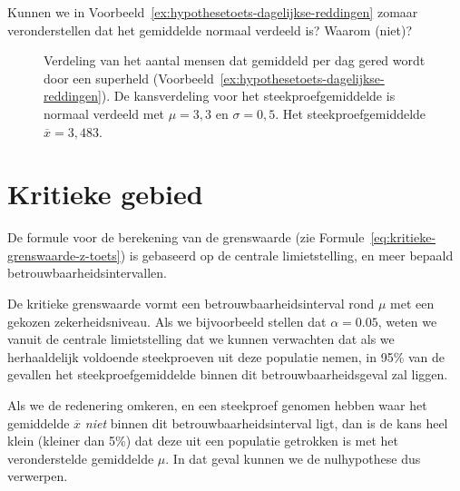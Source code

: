 \begin{exercise}
  Kunnen we in Voorbeeld~\ref{ex:hypothesetoets-dagelijkse-reddingen} zomaar veronderstellen dat het gemiddelde normaal verdeeld is? Waarom (niet)?
\end{exercise}

\begin{figure}
  \centering
  \caption{Verdeling van het aantal mensen dat gemiddeld per dag gered wordt door een superheld (Voorbeeld~\ref{ex:hypothesetoets-dagelijkse-reddingen}). De kansverdeling voor het steekproefgemiddelde is normaal verdeeld met $\mu = 3,3$ en $\sigma = 0,5$. Het steekproefgemiddelde $\overline{x} =3,483$.}
  \label{fig:hypothesetoets-reddingen-per-dag}
\end{figure}

\section{Kritieke gebied}
\label{sec:kritieke-gebied}

De formule voor de berekening van de grenswaarde (zie Formule~\ref{eq:kritieke-grenswaarde-z-toets}) is gebaseerd op de centrale limietstelling, en meer bepaald betrouwbaarheidsintervallen.

De kritieke grenswaarde vormt een betrouwbaarheidsinterval rond $\mu$ met een gekozen zekerheidsniveau. Als we bijvoorbeeld stellen dat $\alpha = 0.05$, weten we vanuit de centrale limietstelling dat we kunnen verwachten dat als we herhaaldelijk voldoende steekproeven uit deze populatie nemen, in 95\% van de gevallen het steekproefgemiddelde binnen dit betrouwbaarheidsgeval zal liggen.

Als we de redenering omkeren, en een steekproef genomen hebben waar het gemiddelde $\overline{x}$ \emph{niet} binnen dit betrouwbaarheidsinterval ligt, dan is de kans heel klein (kleiner dan 5\%) dat deze uit een populatie getrokken is met het veronderstelde gemiddelde $\mu$. In dat geval kunnen we de nulhypothese dus verwerpen.

